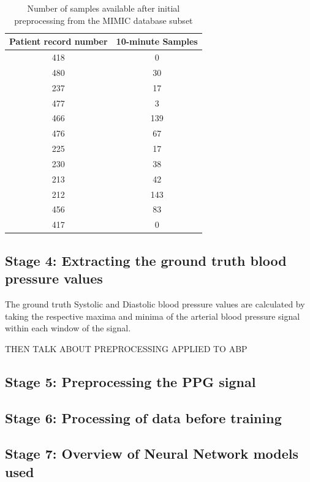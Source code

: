 \begin{table}[H]
        \centering
        \caption{Number of samples available after initial preprocessing from the MIMIC database subset}
        \label{tabSamplesAvailable}
        \begin{tabular}{cc}
        \hline
        \textbf{Patient record number} & \textbf{10-minute Samples} \\ \hline
        418 &  0\\
        480 &  30\\
        237 &  17\\
        477 &  3\\
        466 &  139\\
        476 &  67\\
        225 &  17\\
        230 &  38\\
        213 &  42\\
        212 &  143\\
        456 &  83\\
        417 &  0\\ \hline
        \end{tabular}
\end{table}   

\subsection{Stage 4: Extracting the ground truth blood pressure values}
The ground truth Systolic and Diastolic blood pressure values are calculated by taking the respective 
maxima and minima of the arterial blood pressure signal within each window of the signal.

THEN TALK ABOUT PREPROCESSING APPLIED TO ABP




\subsection{Stage 5: Preprocessing the PPG signal}

\subsection{Stage 6: Processing of data before training}


\subsection{Stage 7: Overview of Neural Network models used}


